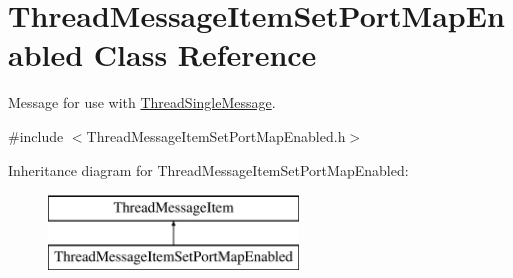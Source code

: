 \hypertarget{class_thread_message_item_set_port_map_enabled}{
\section{ThreadMessageItemSetPortMapEnabled Class Reference}
\label{class_thread_message_item_set_port_map_enabled}
}


Message for use with \hyperlink{class_thread_single_message}{ThreadSingleMessage}.  




{\ttfamily \#include $<$ThreadMessageItemSetPortMapEnabled.h$>$}

Inheritance diagram for ThreadMessageItemSetPortMapEnabled:\begin{figure}[H]
\begin{center}
\leavevmode
\includegraphics[height=2.000000cm]{class_thread_message_item_set_port_map_enabled}
\end{center}
\end{figure}
